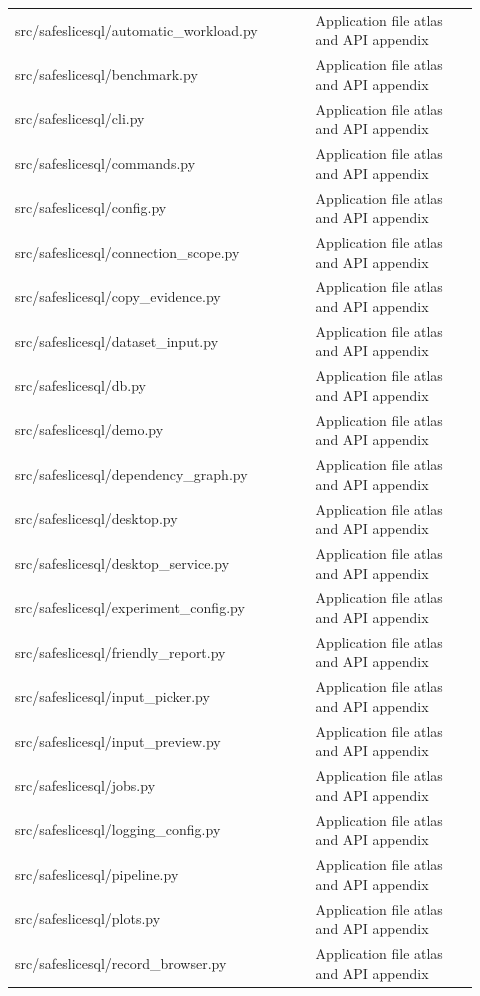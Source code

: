 \begin{longtable}{>{\raggedright\arraybackslash}p{0.598\linewidth}>{\raggedright\arraybackslash}p{0.322\linewidth}}
src/safeslicesql/automatic\_workload.py & Application file atlas and API appendix \\[4pt]
src/safeslicesql/benchmark.py & Application file atlas and API appendix \\[4pt]
src/safeslicesql/cli.py & Application file atlas and API appendix \\[4pt]
src/safeslicesql/commands.py & Application file atlas and API appendix \\[4pt]
src/safeslicesql/config.py & Application file atlas and API appendix \\[4pt]
src/safeslicesql/connection\_scope.py & Application file atlas and API appendix \\[4pt]
src/safeslicesql/copy\_evidence.py & Application file atlas and API appendix \\[4pt]
src/safeslicesql/dataset\_input.py & Application file atlas and API appendix \\[4pt]
src/safeslicesql/db.py & Application file atlas and API appendix \\[4pt]
src/safeslicesql/demo.py & Application file atlas and API appendix \\[4pt]
src/safeslicesql/dependency\_graph.py & Application file atlas and API appendix \\[4pt]
src/safeslicesql/desktop.py & Application file atlas and API appendix \\[4pt]
src/safeslicesql/desktop\_service.py & Application file atlas and API appendix \\[4pt]
src/safeslicesql/experiment\_config.py & Application file atlas and API appendix \\[4pt]
src/safeslicesql/friendly\_report.py & Application file atlas and API appendix \\[4pt]
src/safeslicesql/input\_picker.py & Application file atlas and API appendix \\[4pt]
src/safeslicesql/input\_preview.py & Application file atlas and API appendix \\[4pt]
src/safeslicesql/jobs.py & Application file atlas and API appendix \\[4pt]
src/safeslicesql/logging\_config.py & Application file atlas and API appendix \\[4pt]
src/safeslicesql/pipeline.py & Application file atlas and API appendix \\[4pt]
src/safeslicesql/plots.py & Application file atlas and API appendix \\[4pt]
src/safeslicesql/record\_browser.py & Application file atlas and API appendix \\[4pt]

\end{longtable}
